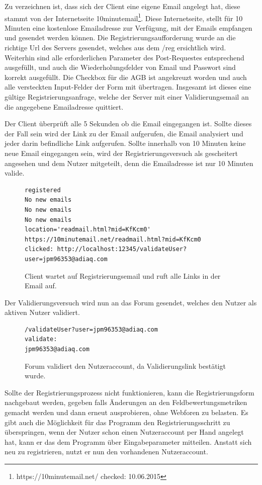 Zu verzeichnen ist, dass sich der Client eine eigene Email angelegt hat, diese stammt von der Internetseite 10minutemail\footnote{https://10minutemail.net/ checked: 10.06.2015}.
Diese Internetseite, stellt für 10 Minuten eine kostenlose Emailadresse zur Verfügung, mit der Emails empfangen und gesendet werden können. Die Registrierungsaufforderung wurde an die richtige Url des Servers gesendet, welches aus dem /reg ersichtlich wird. Weiterhin sind alle erforderlichen Parameter des Post-Requestes entsprechend ausgefüllt, und auch die Wiederholungsfelder von Email und Passwort sind korrekt ausgefüllt. Die Checkbox für die AGB ist angekreuzt worden und auch alle versteckten Input-Felder der Form mit übertragen. Insgesamt ist dieses eine gültige Registrierungsanfrage, welche der Server mit einer Validierungsemail an die angegebene Emailadresse quittiert.

Der Client überprüft alle 5 Sekunden ob die Email eingegangen ist. Sollte dieses der Fall sein wird der Link zu der Email aufgerufen, die Email analysiert und jeder darin befindliche Link aufgerufen. Sollte innerhalb von 10 Minuten keine neue Email eingegangen sein, wird der Registrierungsversuch als gescheitert angesehen und dem Nutzer mitgeteilt, denn die Emailadresse ist nur 10 Minuten valide.

\begin{figure}[ht]
\begin{lstlisting}[language=HTML5]
registered
No new emails
No new emails
No new emails
location='readmail.html?mid=KfKcm0'
https://10minutemail.net/readmail.html?mid=KfKcm0
clicked: http://localhost:12345/validateUser?user=jpm96353@adiaq.com
\end{lstlisting}
\caption{Client wartet auf Registrierungsemail und ruft alle Links in der Email auf.}
\end{figure}

Der Validierungsversuch wird nun an das Forum gesendet, welches den Nutzer als aktiven Nutzer validiert.

\begin{figure}[ht]
\begin{lstlisting}[language=HTML5]
/validateUser?user=jpm96353@adiaq.com
validate:
jpm96353@adiaq.com
\end{lstlisting}
\caption{Forum validiert den Nutzeraccount, da Validierungslink bestätigt wurde.}
\end{figure}

Sollte der Registrierungsprozess nicht funktionieren, kann die Registrierungsform nachgebaut werden, gegeben falls Änderungen an den Feldbewertungsmetriken gemacht werden und dann erneut ausprobieren, ohne Webforen zu belasten. Es gibt auch die Möglichkeit für das Programm den Registrierungsschritt zu überspringen, wenn der Nutzer schon einen Nutzeraccount per Hand angelegt hat, kann er das dem Programm über Eingabeparameter mitteilen. Anstatt sich neu zu registrieren, nutzt er nun den vorhandenen Nutzeraccount.

